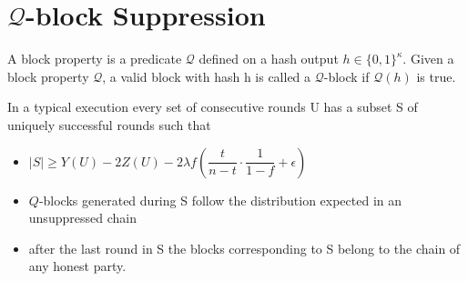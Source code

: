 \section{$\mathcal{Q}$-block Suppression}
\begin{definition}
    \cite{dionyziz}
    A block property is a predicate $\mathcal{Q}$ defined on a hash output $h \in \{ 0, 1 \}^\kappa$. Given  a block property $\mathcal{Q}$, a valid block with hash h is called a $\mathcal{Q}$-block if $\mathcal{Q}(h)$ is true.
\end{definition}

\begin{lemma}[Unsuppressibility]\cite{dionyziz}
    In a typical execution every set of consecutive rounds U has a subset S of uniquely successful rounds such that
    \begin{itemize}
        \item $\lvert S \rvert \geq Y(U) - 2Z(U) - 2 \lambda f (\dfrac{t}{n-t} \cdot \dfrac{1}{1-f} + \epsilon)$
        \item $Q$-blocks generated during S follow the distribution expected in an unsuppressed chain
        \item after the last round in S the blocks corresponding to S belong to the chain of any honest party.
    \end{itemize}
\end{lemma}


